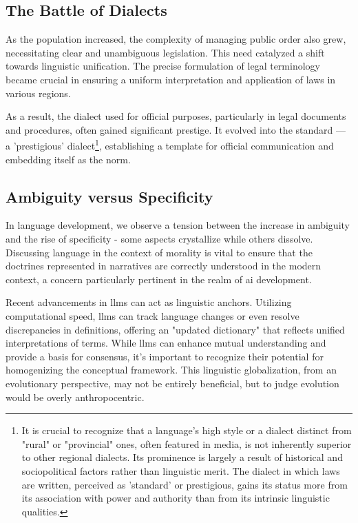 \documentclass[11pt,a4]{article}
\begin{document}
    \subsection{The Battle of Dialects}
    As the population increased, the complexity of managing public order also grew, necessitating clear and unambiguous legislation. This need catalyzed a shift towards linguistic unification. The precise formulation of legal terminology became crucial in ensuring a uniform interpretation and application of laws in various regions.
    \par
    As a result, the dialect used for official purposes, particularly in legal documents and procedures, often gained significant prestige. It evolved into the standard — a 'prestigious' dialect\footnote{It is crucial to recognize that a language's high style or a dialect distinct from "rural" or "provincial" ones, often featured in media, is not inherently superior to other regional dialects. Its prominence is largely a result of historical and sociopolitical factors rather than linguistic merit. The dialect in which laws are written, perceived as 'standard' or prestigious, gains its status more from its association with power and authority than from its intrinsic linguistic qualities.}, establishing a template for official communication and embedding itself as the norm.

    \subsection{Ambiguity versus Specificity}
    In language development, we observe a tension between the increase in ambiguity and the rise of specificity - some aspects crystallize while others dissolve. Discussing language in the context of morality is vital to ensure that the doctrines represented in narratives are correctly understood in the modern context, a concern particularly pertinent in the realm of \acrshort{ai} development.
    \par
    Recent advancements in \glspl{llm} can act as linguistic anchors.
    Utilizing computational speed, \glspl{llm}  can track language changes or even resolve discrepancies in definitions, offering an "updated dictionary" that reflects unified interpretations of terms. While \glspl{llm}  can enhance mutual understanding and provide a basis for consensus, it's important to recognize their potential for homogenizing the conceptual framework. This linguistic globalization, from an evolutionary perspective, may not be entirely beneficial, but to judge evolution would be overly anthropocentric.
\end{document}
